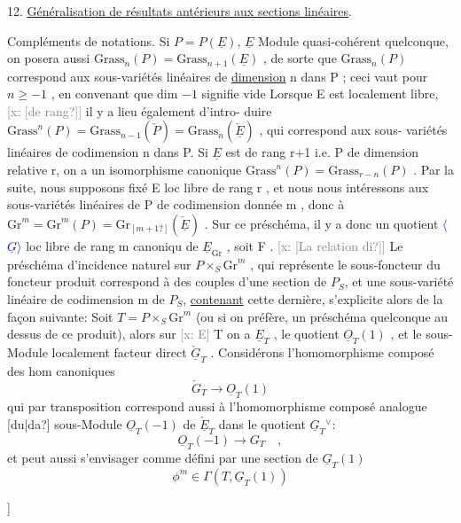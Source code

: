 \documentclass[11pt]{article}
\newcommand{\scanpage}[1]{\par\bigskip\noindent{\small\sffamily[scan #1]}\par}
\newcommand{\mspage}[1]{{\small\sffamily[p.\,#1]}}
\newcommand{\hand}[1]{\textcolor{blue}{#1}}
\newcommand{\inserted}[2][]{\textcolor{blue}{$\langle$#2$\rangle$}}
\newcommand{\xout}[1]{\textcolor{gray}{[\textsf{x:} #1]}}
\newcommand{\uline}[1]{\underline{#1}}
\newcommand{\unsure}[1]{[#1?]}
\begin{document}
12. \uline{Généralisation de résultats antérieurs aux sections linéaires}.

Compléments de notations. Si $P = P(\underline{E})$, $\underline{E}$ Module quasi-cohérent
quelconque, on posera aussi $\mathrm{Grass}_n(P) = \mathrm{Grass}_{n+1}(\underline{E})$ , de sorte que
$\mathrm{Grass}_n(P)$ correspond aux sous-variétés linéaires de \uline{dimension} n dans
P ; ceci vaut pour $n \geq -1$ , en convenant que dim $-1$ signifie vide
Lorsque E est localement libre, \xout{\unsure{de rang}} il y a lieu également d'intro-%
duire $\mathrm{Grass}^n(P) = \mathrm{Grass}_{n-1}(\check{P}) = \mathrm{Grass}_n(\check{\underline{E}})$ , qui correspond aux sous-%
variétés linéaires de codimension n dans P. Si $\underline{E}$ est de rang r+1 i.e.
P de dimension relative r, on a un isomorphisme canonique
$\mathrm{Grass}^n(P) = \mathrm{Grass}_{r-n}(P)$ . Par la suite, nous supposons fixé E loc
libre de rang r , et nous nous intéressons aux sous-variétés linéaires
de P de codimension donnée m , donc à $\mathrm{Gr}^m = \mathrm{Gr}^m(P) = \mathrm{Gr}_{\unsure{m+1}}(\check{\underline{E}})$ .
Sur ce préschéma, il y a donc un quotient \inserted{$\underline{G}$} loc libre de rang m canoniqu
de $\underline{E}_{\mathrm{Gr}}$ , soit F . \xout{\unsure{La relation di}} Le préschéma d'incidence naturel
sur $P\times_S \mathrm{Gr}^m$ , qui représente le sous-foncteur du foncteur produit
correspond à des couples d'une section de $P_S$, et une sous-variété
linéaire de codimension m de $P_S$, \uline{contenant} cette dernière, s'explicite
alors de la façon suivante: Soit $T=P\times_S \mathrm{Gr}^m$ (ou si on préfère, un
préschéma quelconque au dessus de ce produit), alors sur \xout{E} T on a
$\underline{E}_T$ , le quotient $\underline{O}_T(1)$ , et le sous-Module localement facteur direct
$\check{\underline{G}}_T$ . Considérons l'homomorphisme composé des hom canoniques
\[ \check{G}_T \longrightarrow \underline{O}_T(1) \]
qui par transposition correspond aussi à l'homomorphisme composé
analogue \unsure{du|da} sous-Module $\underline{O}_T(-1)$ de $\check{\underline{E}}_T$ dans le quotient $\underline{G}_T{}^{\vee}$:
\[ \underline{O}_T(-1) \longrightarrow G_T \quad , \]
et peut aussi s'envisager comme défini par une section de $\underline{G}_T(1)$
\[ \phi^m \in \Gamma(T, \underline{G}_T(1)) \]

\mspage{\hand{66}}

\clearpage
\scanpage{25/67}
\mspage{\unsure{56}}
\end{document}
